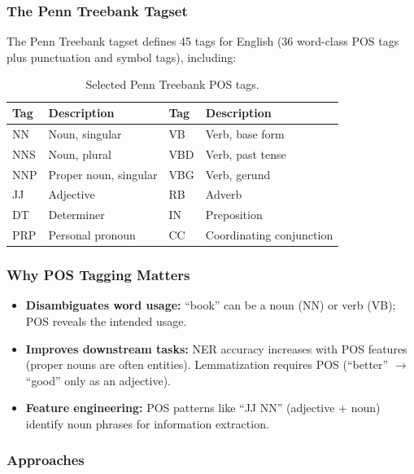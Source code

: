 \subsubsection{The Penn Treebank Tagset}

The Penn Treebank tagset defines 45 tags for English (36 word-class POS tags plus
punctuation and symbol tags), including:

\begin{table}[H]
\centering
\caption{Selected Penn Treebank POS tags.}
\label{tab:pos_tags}
\small
\begin{tabular}{@{}llll@{}}
\toprule
\textbf{Tag} & \textbf{Description} & \textbf{Tag} & \textbf{Description} \\
\midrule
NN & Noun, singular & VB & Verb, base form \\
NNS & Noun, plural & VBD & Verb, past tense \\
NNP & Proper noun, singular & VBG & Verb, gerund \\
JJ & Adjective & RB & Adverb \\
DT & Determiner & IN & Preposition \\
PRP & Personal pronoun & CC & Coordinating conjunction \\
\bottomrule
\end{tabular}
\end{table}

\subsubsection{Why POS Tagging Matters}

\begin{itemize}
    \item \textbf{Disambiguates word usage:} ``book'' can be a noun (NN) or verb (VB);
    POS reveals the intended usage.
    \item \textbf{Improves downstream tasks:} NER accuracy increases with POS features
    (proper nouns are often entities). Lemmatization requires POS (``better'' $\to$
    ``good'' only as an adjective).
    \item \textbf{Feature engineering:} POS patterns like ``JJ NN'' (adjective + noun)
    identify noun phrases for information extraction.
\end{itemize}

\subsubsection{Approaches}

